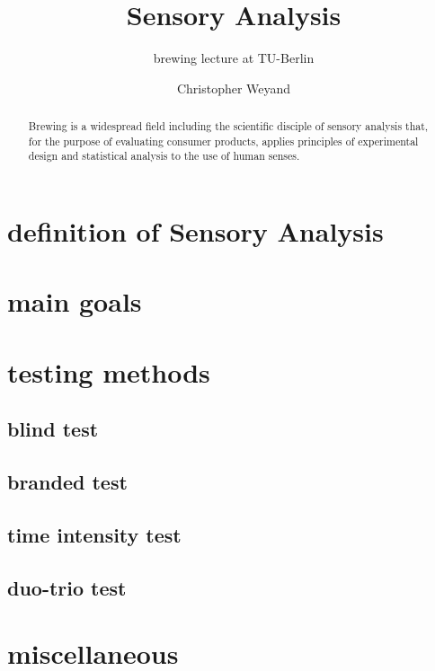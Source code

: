 \documentclass[]{scrartcl}
\begin{document}
\title{Sensory Analysis}
\subtitle{brewing lecture at TU-Berlin}
\author{Christopher Weyand}
\maketitle
\begin{abstract}
Brewing is a widespread field including the scientific disciple of sensory analysis
that, for the purpose of evaluating consumer products, applies principles of experimental
design and statistical analysis to the use of human senses.
\end{abstract}
\newpage

\tableofcontents
\newpage


\section{definition of Sensory Analysis}

\section{main goals}

\section{testing methods}
\subsection{blind test}
\subsection{branded test}
\subsection{time intensity test}
\subsection{duo-trio test}

\section{miscellaneous}
\end{document}
